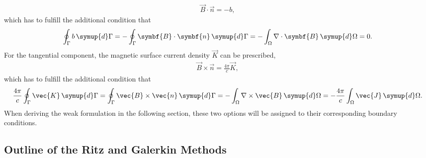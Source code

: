 \begin{gather}
  \vec{B} \cdot \vec{n} = -b, \label{eq:perp_bc}
\end{gather}
which has to fulfill the additional condition that
\begin{gather*}
  \oint_{\Gamma} b \, \symup{d} \Gamma = -\oint_{\Gamma} \symbf{B} \cdot \symbf{n} \, \symup{d} \Gamma = -\int_{\Omega} \nabla \cdot \symbf{B} \, \symup{d} \Omega = 0.
\end{gather*}
For the tangential component, the magnetic surface current density $\vec{K}$ can be prescribed,
\begin{gather}
  \vec{B} \times \vec{n} = \frac{4 \pi}{c} \vec{K}, \label{eq:par_bc}
\end{gather}
which has to fulfill the additional condition that
\begin{gather*}
  \frac{4 \pi}{c} \oint_{\Gamma} \vec{K} \, \symup{d} \Gamma = \oint_{\Gamma} \vec{B} \times \vec{n} \, \symup{d} \Gamma = -\int_{\Omega} \curl \vec{B} \, \symup{d} \Omega = -\frac{4 \pi}{c} \int_{\Omega} \vec{J} \, \symup{d} \Omega.
\end{gather*}
When deriving the weak formulation in the following section, these two options will be assigned to their corresponding boundary conditions.

\subsection{Outline of the Ritz and Galerkin Methods}
\label{sec:ritz-galerkin}

